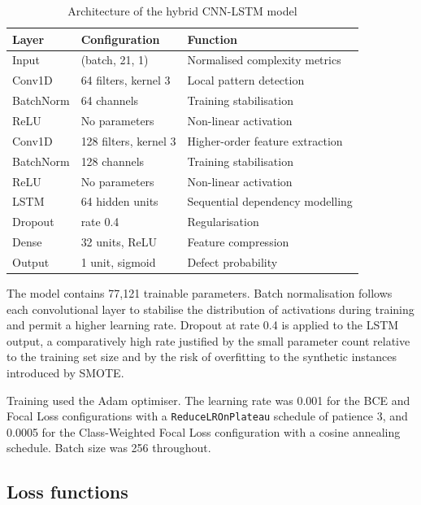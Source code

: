 \documentclass[12pt,a4paper,oneside]{report}
\newcommand{\tabfont}{\fontsize{11}{13}\selectfont\setlength{\tabcolsep}{4pt}}
\begin{document}
\begin{table}[H]
\centering
\caption{Architecture of the hybrid CNN-LSTM model}
\label{tab:arch}
\tabfont
\begin{tabular}{L{28mm}L{45mm}L{58mm}}
\toprule
\textbf{Layer} & \textbf{Configuration} & \textbf{Function} \\
\midrule
Input       & (batch, 21, 1)        & Normalised complexity metrics \\
Conv1D      & 64 filters, kernel 3  & Local pattern detection \\
BatchNorm   & 64 channels           & Training stabilisation \\
ReLU        & No parameters         & Non-linear activation \\
Conv1D      & 128 filters, kernel 3 & Higher-order feature extraction \\
BatchNorm   & 128 channels          & Training stabilisation \\
ReLU        & No parameters         & Non-linear activation \\
LSTM        & 64 hidden units       & Sequential dependency modelling \\
Dropout     & rate 0.4              & Regularisation \\
Dense       & 32 units, ReLU        & Feature compression \\
Output      & 1 unit, sigmoid       & Defect probability \\
\bottomrule
\end{tabular}
\end{table}

The model contains 77,121 trainable parameters. Batch normalisation follows each convolutional layer to stabilise the distribution of activations during training and permit a higher learning rate. Dropout at rate 0.4 is applied to the LSTM output, a comparatively high rate justified by the small parameter count relative to the training set size and by the risk of overfitting to the synthetic instances introduced by SMOTE.

Training used the Adam optimiser. The learning rate was 0.001 for the BCE and Focal Loss configurations with a \texttt{ReduceLROnPlateau} schedule of patience 3, and 0.0005 for the Class-Weighted Focal Loss configuration with a cosine annealing schedule. Batch size was 256 throughout.

\subsection{Loss functions}
\end{document}
